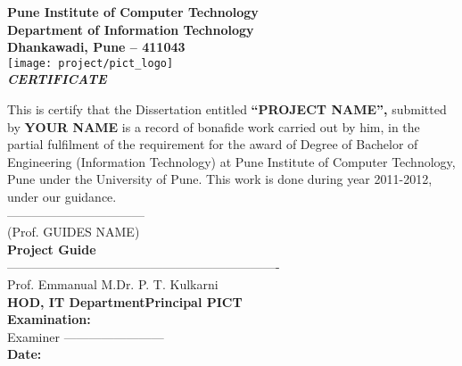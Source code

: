 \begin{center}
\thispagestyle{empty}

\LARGE{\textbf{Pune Institute of Computer Technology}} \\ 
\large{\textbf{Department of Information Technology}}\\
\large{\textbf{Dhankawadi, Pune – 411043}}\\[0.5cm]

\texttt{[image: project/pict\_logo]}\\[0.5cm]

{\Huge \textbf{\emph{CERTIFICATE}}}\\[0.5cm]
\end{center}
\linespread{1.13}
\large{This is certify that the Dissertation entitled 
\textbf{``PROJECT NAME'',} 
submitted by 
\textbf{YOUR NAME}
 is a record of bonafide work carried out by him, in the partial
 fulfilment of the requirement for the award of Degree of Bachelor of
 Engineering (Information Technology) at Pune Institute of Computer
 Technology, Pune under the University of Pune. This work is done
 during year 2011-2012, under our guidance.}\\[1.0cm]
\large{---------------------------------}\\
\large{(Prof. GUIDES NAME)}\\[0.3cm]
\textbf{Project Guide}\\[1.0cm]
\large{--------------------------------}\hspace*{1.5in}\large{----------------------------------}\\
\large{Prof. Emmanual M.}\hspace*{2.0in}\large{Dr. P. T. Kulkarni}\\[0.3cm]
\textbf{HOD, IT Department}\hspace*{1.73in}\textbf{Principal PICT}\\[0.5cm]
\Large{\textbf{Examination:}}\\[0.8cm]
\large{Examiner ------------------------}\\[0.8cm]
\Large{\textbf{Date:}}
\newpage
